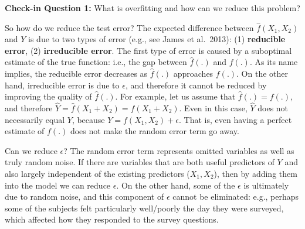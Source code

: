 \documentclass{book}
\begin{document}
\textbf{Check-in Question 1:} What is overfitting and how can we reduce this
problem?

So how do we reduce the test error? The expected difference between
\(\hat{f}(X_{1},X_{2})\) and \(Y\) is due to two types of error (e.g., see
James et al.~2013): (1) \textbf{reducible error}, (2) \textbf{irreducible
error}. The first type of error is caused by a suboptimal estimate of the true
function: i.e., the gap between \(\hat{f}(.)\) and \(f(.)\). As its name
implies, the reducible error decreases as \(\hat{f}(.)\) approaches \(f(.)\).
On the other hand, irreducible error is due to \(\epsilon\), and therefore it
cannot be reduced by improving the quality of \(\hat{f}(.)\). For example, let
us assume that \(\hat{f}(.) = f(.)\), and therefore
\(\hat{Y} = \hat{f}( X_{1}+X_{2}) = f(X_{1}+X_{2})\). Even in this case,
\(\hat{Y}\) does not necessarily equal \(Y\), because
\(Y = f(X_{1}, X_{2}) + \epsilon\). That is, even having a perfect estimate of
\(f(.)\) does not make the random error term go away.

Can we reduce \(\epsilon\)? The random error term represents omitted variables
as well as truly random noise. If there are variables that are both useful
predictors of \(Y\) and also largely independent of the existing predictors
(\(X_{1},X_{2}\)), then by adding them into the model we can reduce
\(\epsilon\). On the other hand, some of the \(\epsilon\) is ultimately due to
random noise, and this component of \(\epsilon\) cannot be eliminated: e.g.,
perhaps some of the subjects felt particularly well/poorly the day they were
surveyed, which affected how they responded to the survey questions.
\end{document}
